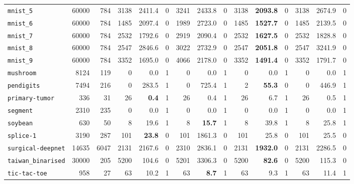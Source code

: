 \begin{tabular}{lccrrrrrrrrrrrr}
\texttt{mnist\_5} & \multicolumn{1}{r}{60000} & \multicolumn{1}{r}{784}  & 3138 & 2411.4 & 0 & 3241 & 2433.8 & 0 & 3138 & \textbf{2093.8} & 0 & 3138 & 2674.9 & 0\\
\texttt{mnist\_6} & \multicolumn{1}{r}{60000} & \multicolumn{1}{r}{784}  & 1485 & 2097.4 & 0 & 1989 & 2723.0 & 0 & 1485 & \textbf{1527.7} & 0 & 1485 & 2139.5 & 0\\
\texttt{mnist\_7} & \multicolumn{1}{r}{60000} & \multicolumn{1}{r}{784}  & 2532 & 1792.6 & 0 & 2919 & 2090.4 & 0 & 2532 & \textbf{1627.5} & 0 & 2532 & 1828.8 & 0\\
\texttt{mnist\_8} & \multicolumn{1}{r}{60000} & \multicolumn{1}{r}{784}  & 2547 & 2846.6 & 0 & 3022 & 2732.9 & 0 & 2547 & \textbf{2051.8} & 0 & 2547 & 3241.9 & 0\\
\texttt{mnist\_9} & \multicolumn{1}{r}{60000} & \multicolumn{1}{r}{784}  & 3352 & 1695.0 & 0 & 4066 & 2178.0 & 0 & 3352 & \textbf{1491.4} & 0 & 3352 & 1791.7 & 0\\
\texttt{mushroom} & \multicolumn{1}{r}{8124} & \multicolumn{1}{r}{119}  & 0 & 0.0 & 1 & 0 & 0.0 & 1 & 0 & 0.0 & 1 & 0 & 0.0 & 1\\
\texttt{pendigits} & \multicolumn{1}{r}{7494} & \multicolumn{1}{r}{216}  & 0 & 283.5 & 1 & 0 & 725.4 & 1 & 2 & \textbf{55.3} & 0 & 0 & 446.9 & 1\\
\texttt{primary-tumor} & \multicolumn{1}{r}{336} & \multicolumn{1}{r}{31}  & 26 & \textbf{0.4} & 1 & 26 & 0.4 & 1 & 26 & 6.7 & 1 & 26 & 0.5 & 1\\
\texttt{segment} & \multicolumn{1}{r}{2310} & \multicolumn{1}{r}{235}  & 0 & 0.0 & 1 & 0 & 0.0 & 1 & 0 & 0.0 & 1 & 0 & 0.0 & 1\\
\texttt{soybean} & \multicolumn{1}{r}{630} & \multicolumn{1}{r}{50}  & 8 & 19.6 & 1 & 8 & \textbf{15.7} & 1 & 8 & 39.8 & 1 & 8 & 25.8 & 1\\
\texttt{splice-1} & \multicolumn{1}{r}{3190} & \multicolumn{1}{r}{287}  & 101 & \textbf{23.8} & 0 & 101 & 1861.3 & 0 & 101 & 25.8 & 0 & 101 & 25.5 & 0\\
\texttt{surgical-deepnet} & \multicolumn{1}{r}{14635} & \multicolumn{1}{r}{6047}  & 2131 & 2167.6 & 0 & 2310 & 2836.1 & 0 & 2131 & \textbf{1932.0} & 0 & 2131 & 2286.5 & 0\\
\texttt{taiwan\_binarised} & \multicolumn{1}{r}{30000} & \multicolumn{1}{r}{205}  & 5200 & 104.6 & 0 & 5201 & 3306.3 & 0 & 5200 & \textbf{82.6} & 0 & 5200 & 115.3 & 0\\
\texttt{tic-tac-toe} & \multicolumn{1}{r}{958} & \multicolumn{1}{r}{27}  & 63 & 10.2 & 1 & 63 & \textbf{8.7} & 1 & 63 & 9.3 & 1 & 63 & 11.4 & 1\\

\end{tabular}
